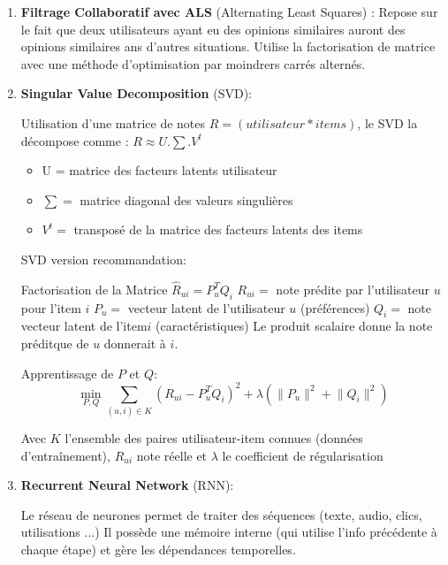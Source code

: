 \documentclass{article}
\begin{document}
\begin{enumerate}
    \item \textbf{Filtrage Collaboratif avec ALS} (Alternating Least Squares) :
          Repose sur le fait que deux utilisateurs ayant eu des opinions similaires auront des opinions similaires ans d'autres situations. Utilise la factorisation de matrice avec une méthode d'optimisation par moindrers carrés alternés.
    \item \textbf{Singular Value Decomposition} (SVD):

          Utilisation d'une matrice de notes \(R = (utilisateur*items)\), le SVD la décompose comme : \(R \approx U . \sum .
          V^t\)

          \begin{itemize}
              \item U = matrice des facteurs latents utilisateur
              \item \(\sum=\) matrice diagonal des valeurs singulières
              \item \(V^t=\) transposé de la matrice des facteurs latents des items
          \end{itemize}
          SVD version recommandation:

          Factorisation de la Matrice \(\hat{R}_{ui} = P_u^T Q_i \)
          \newline
          \( R_{ui} = \) note prédite par l'utilisateur \(u\) pour l'item \(i\)
          \newline
          \(P_u = \) vecteur latent de l'utilisateur \(u\) (préférences)
          \newline
          \(Q_i = \) note vecteur latent de l'item\(i\) (caractéristiques)
          \newline
          Le produit scalaire donne la note préditque de \(u\) donnerait à \(i\).

          Apprentissage de \(P\) et \(Q\): \[ \min_{P, Q} \sum_{(u,i) \in K} \left( R_{ui} - P_u^T Q_i \right)^2 + \lambda \left( \lVert P_u \rVert^2 + \lVert Q_i \rVert^2 \right)\]

          Avec \(K\) l'ensemble des paires utilisateur-item connues (données d'entraînement), \(R_{ui}\) note réelle et \(\lambda\) le coefficient de régularisation

    \item \textbf{Recurrent Neural Network} (RNN):

          Le réseau de neurones permet de traiter des séquences (texte, audio, clics, utilisations ...) Il possède une mémoire interne (qui utilise l'info précédente à chaque étape) et gère les dépendances temporelles.


\end{enumerate}
\end{document}
